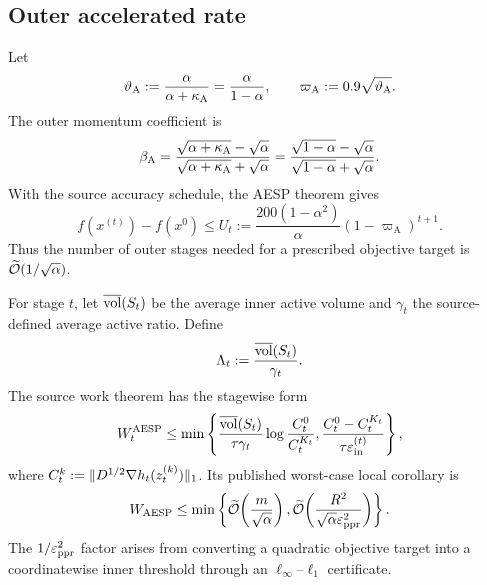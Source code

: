 \subsection{Outer accelerated rate}

Let
\begin{equation}
  \vartheta_{\mathrm A}:=\frac{\alpha}{\alpha+\kappa_{\rm A}}
  =\frac{\alpha}{1-\alpha},
  \qquad
  \varpi_{\mathrm A}:=0.9\sqrt{\vartheta_{\mathrm A}}.
  \label{eq:aesp-q-rho}
\end{equation}
The outer momentum coefficient is
\begin{equation}
  \beta_{\rm A}
  =\frac{\sqrt{\alpha+\kappa_{\rm A}}-\sqrt\alpha}
         {\sqrt{\alpha+\kappa_{\rm A}}+\sqrt\alpha}
  =\frac{\sqrt{1-\alpha}-\sqrt\alpha}
         {\sqrt{1-\alpha}+\sqrt\alpha}.
  \label{eq:aesp-beta}
\end{equation}
With the source accuracy schedule, the AESP theorem gives
\begin{equation}
  f(x^{(t)})-f(x^0)
  \leq
  U_t
  :=\frac{200(1-\alpha^2)}{\alpha}
       (1-\varpi_{\mathrm A})^{t+1}.
  \label{eq:aesp-outer-bound}
\end{equation}
Thus the number of outer stages needed for a prescribed objective target is
$\widetilde{\mathcal{O}}(1/\sqrt\alpha)$.

For stage $t$, let $\overline{\operatorname{vol}}(S_t)$ be the average inner active volume
and $\gamma_t$ the source-defined average active ratio.  Define
\begin{equation}
  \Lambda_t
  :=\frac{\overline{\operatorname{vol}}(S_t)}{\gamma_t}.
  \label{eq:Lambda-t}
\end{equation}
The source work theorem has the stagewise form
\begin{equation}
  W_t^{\rm AESP}
  \leq
  \min\left\{
    \frac{\overline{\operatorname{vol}}(S_t)}{\tau\gamma_t}
      \log\frac{C_t^0}{C_t^{K_t}},
    \frac{C_t^0-C_t^{K_t}}{\tau\varepsilon_{\mathrm{in}}^{(t)}}
  \right\},
  \label{eq:aesp-stage-work}
\end{equation}
where
$C_t^k:=\lVert D^{1/2}\nabla h_t(z_t^{(k)})\rVert_1$.  Its published
worst-case local corollary is
\begin{equation}
  W_{\rm AESP}
  \leq
  \min\left\{
    \widetilde{\mathcal{O}}\!\left(\frac{m}{\sqrt\alpha}\right),
    \widetilde{\mathcal{O}}\!\left(\frac{R^2}{\sqrt\alpha\varepsilon_{\mathrm{ppr}}^2}\right)
  \right\}.
  \label{eq:aesp-published-bound}
\end{equation}
The $1/\varepsilon_{\mathrm{ppr}}^2$ factor arises from converting a quadratic objective target into
a coordinatewise inner threshold through an $\ell_\infty$--$\ell_1$
certificate.

